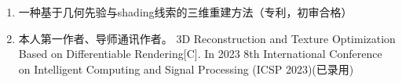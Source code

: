 
\achievement

\begin{enumerate}[leftmargin =0.7cm]
\renewcommand{\labelenumi}{[\theenumi]}
\item  一种基于几何先验与shading线索的三维重建方法（专利，初审合格）
\item 本人第一作者、导师通讯作者。 3D Reconstruction and Texture Optimization Based on Differentiable Rendering[C]. In 2023 8th International Conference on Intelligent Computing and Signal Processing (ICSP 2023)(已录用)

\end{enumerate}

